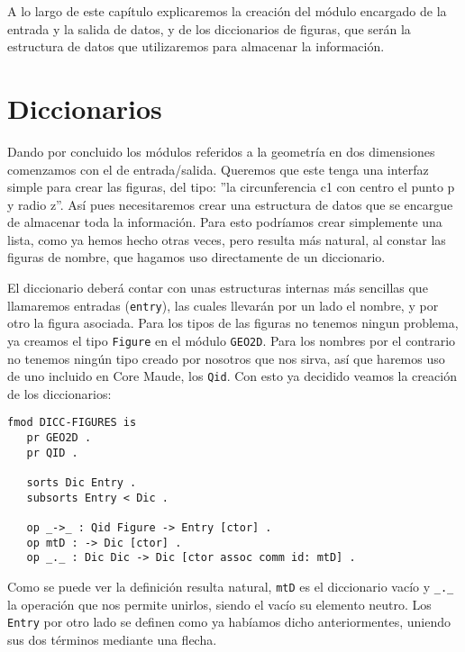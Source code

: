 
A lo largo de este capítulo explicaremos la creación del módulo encargado de la entrada y la salida de datos, y de los diccionarios de figuras, que serán la estructura de datos que utilizaremos para almacenar la información.\par

\section{Diccionarios}

Dando por concluido los módulos referidos a la geometría en dos dimensiones comenzamos con el de entrada/salida. Queremos que este tenga una interfaz simple para crear las figuras, del tipo: ''la circunferencia c1 con centro el punto p y radio z''. Así pues necesitaremos crear una estructura de datos que se encargue de almacenar toda la información. Para esto podríamos crear simplemente una lista, como ya hemos hecho otras veces, pero resulta más natural, al constar las figuras de nombre, que hagamos uso directamente de un diccionario. \par

El diccionario deberá contar con unas estructuras internas más sencillas que llamaremos entradas (\texttt{entry}), las cuales llevarán por un lado el nombre, y por otro la figura asociada. Para los tipos de las figuras no tenemos ningun problema, ya creamos el tipo \texttt{Figure} en el módulo \texttt{GEO2D}. Para los nombres por el contrario no tenemos ningún tipo creado por nosotros que nos sirva, así que haremos uso de uno incluido en Core Maude, los \texttt{Qid}. Con esto ya decidido veamos la creación de los diccionarios:\par

{\codesize
\begin{verbatim}
fmod DICC-FIGURES is
   pr GEO2D .
   pr QID .

   sorts Dic Entry .
   subsorts Entry < Dic .

   op _->_ : Qid Figure -> Entry [ctor] .
   op mtD : -> Dic [ctor] .
   op _._ : Dic Dic -> Dic [ctor assoc comm id: mtD] .

\end{verbatim}
}

Como se puede ver la definición resulta natural, \texttt{mtD} es el diccionario vacío y \verb"_._" la operación que nos permite unirlos, siendo el vacío su elemento neutro. Los \texttt{Entry} por otro lado se definen como ya habíamos dicho anteriormentes, uniendo sus dos términos mediante una flecha.\par

